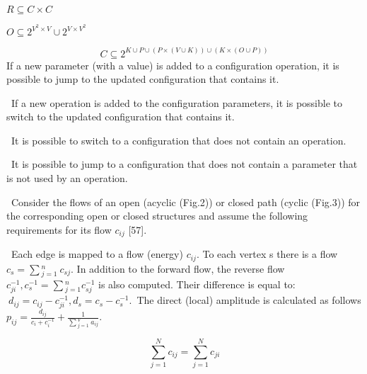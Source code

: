 \documentclass[10pt, a4paper]{article}
\begin{document}
\begin{multicols}{2}
\begin{center}
\begin{math} R \subseteq C × C
\end{math}
\end{center}
\begin{center}
\begin{math}
O \subseteq {2^{V^{2}×V}} \cup {2^{V×V^{2}}}
\end{math} 
\end{center}
\[C \subseteq {2^{K\cup P\cup (P×(V\cup K))\cup (K×(O\cup P)) }}\]
\linespread{0.8}
If a new parameter (with a value) is added to a configuration operation, it is possible to jump to the updated configuration that contains it.
\par \ If a new operation is added to the configuration parameters, it is possible to switch to the updated configuration that contains it.
\par \ It is possible to switch to a configuration that does not contain an operation.
\par \ It is possible to jump to a configuration that does not contain a parameter that is not used by an operation.
\par \ Consider the flows of an open (acyclic (Fig.2)) or closed path (cyclic (Fig.3)) for the corresponding open or closed structures and assume the following requirements for its flow $c_{ij}$ [57].
\par \ Each edge is mapped to a flow (energy) $c_{ij}$. To each
vertex s there is a flow \begin{math} c_s=\sum{{^{n}_{j=1}}}\ c_{sj}\end{math}. 
In addition to the forward flow, the reverse flow \begin{math}
 c{{^{-1}_{ji}}}, c{{^{-1}_{s}}}=\sum{{^{n}_{j=1}}} c{{^{-1}_{sj}}} 
\end{math} is also computed. Their difference is equal to:\begin{math}\
d_{ij} = c_{ij} - c{{^{-1}_{ji}}}, d_s=c_s-c{{^{-1}_{s}}}.
\end{math}\ The direct (local) amplitude is
calculated as follows \begin{math} p_{ij}=\frac{d_{ij}}{c_i+c{{^{-1}_{i}}}} + \frac{1}{\sum{{^{V}_{j=1}}}\ a_{ij}}.
\end{math}

\[\sum_{j=1}^{N}c_{ij}=\sum_{j=1}^{N}c_{ji}\]


\end{multicols}
\end{document}
